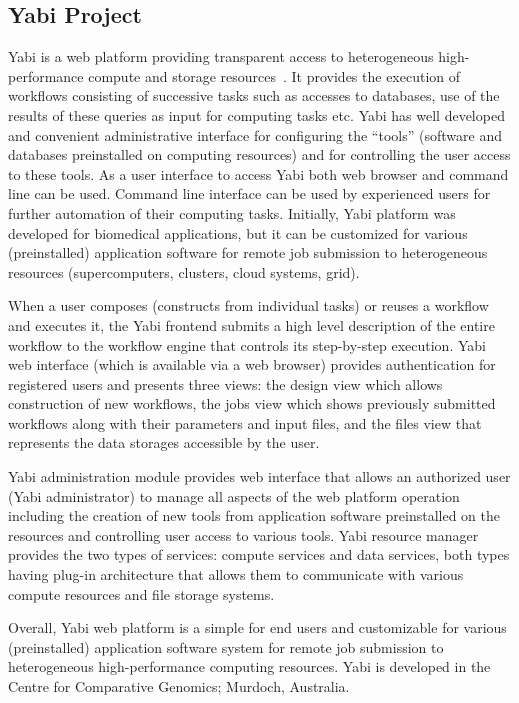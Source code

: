 \documentclass[procedia]{easychair}
\begin{document}
\subsection{Yabi Project}

Yabi is a web platform providing transparent access to heterogeneous high-performance compute and storage resources \cite{19}. It provides the execution of workflows consisting of successive tasks such as accesses to databases, use of the results of these queries as input for computing tasks etc. Yabi has well developed and convenient administrative interface for configuring the ``tools'' (software and databases preinstalled on computing resources) and for controlling the user access to these tools. As a user interface to access Yabi both web browser and command line can be used. Command line interface can be used by experienced users for further automation of their computing tasks. Initially, Yabi platform was developed for biomedical applications, but it can be customized for various (preinstalled) application software for remote job submission to heterogeneous resources (supercomputers, clusters, cloud systems, grid).

When a user composes (constructs from individual tasks) or reuses a workflow and executes it, the Yabi frontend submits a high level description of the entire workflow to the workflow engine that controls its step-by-step execution. Yabi web interface (which is available via a web browser) provides authentication for registered users and presents three views: the design view which allows construction of new workflows, the jobs view which shows previously submitted workflows along with their parameters and input files, and the files view that represents the data storages accessible by the user.

Yabi administration module provides web interface that allows an authorized user (Yabi administrator) to manage all aspects of the web platform operation including the creation of new tools from application software preinstalled on the resources and controlling user access to various tools. Yabi resource manager provides the two types of services: compute services and data services, both types having plug-in architecture that allows them to communicate with various compute resources and file storage systems. 

Overall, Yabi web platform is a simple for end users and customizable for various (preinstalled) application software system for remote job submission to heterogeneous high-performance computing resources. Yabi is developed in the Centre for Comparative Genomics; Murdoch, Australia.
\end{document}

